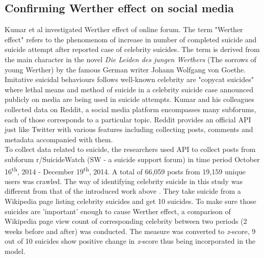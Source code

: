 \subsection{Confirming Werther effect on social media}
Kumar et al \cite{Kumar2015a} investigated Werther effect of online forum. The term "Werther effect" refers to the phenomenom of increase in number of completed suicide and suicide attempt after reported case of celebrity suicides. The term is derived from the main character in the novel \textit{Die Leiden des jungen Werthers} (The sorrows of young Werther) by the famous German writer Johann Wolfgang von Goethe. Imitative suicidal behaviours follows well-known celebrity are "copycat suicides" where lethal means and method of suicide in a celebrity suicide case announced publicly on media are being used in suicide attempts. Kumar and his colleagues collected data on Reddit, a social media platform encompasses many subforums, each of those corresponds to a particular topic. Reddit provides an official API just like Twitter with various features including collecting posts, comments and metadata accompanied with them.\\
To collect data related to suicide, the researchers used API to collect posts from subforum r/SuicideWatch (SW - a suicide support forum) in time period October 16\textsuperscript{th}, 2014 - December 19\textsuperscript{th}, 2014. A total of 66,059 posts from 19,159 unique users was crawled. The way of identifying celebrity suicide in this study was different from that of the introduced work above \cite{Won2013}. They take suicide from a Wikipedia page listing celebrity suicides and get 10 suicides. To make sure those suicides are 'important' enough to cause Werther effect, a comparison of Wikipedia page view count of corresponding celebrity between two periods (2 weeks before and after) was conducted. The measure was converted to \textit{z}-score, 9 out of 10 suicides show positive change in \textit{z}-score thus being incorporated in the model. \\
